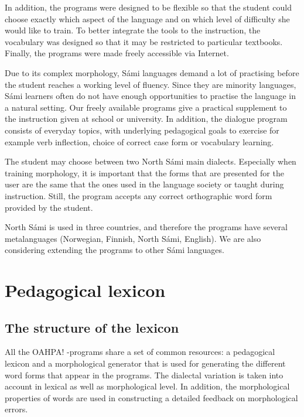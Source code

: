 \documentclass[11pt]{article}
\begin{document}
In addition, the programs were designed to be flexible so that the student could choose exactly which aspect of the language and on which level of difficulty she would like to train. To better integrate the tools to the instruction, the vocabulary was designed so that it may be restricted to particular textbooks. Finally, the programs were made freely accessible via Internet.

Due to its complex morphology, Sámi languages demand a lot of practising before the student reaches 
a working level of fluency. %
Since they are minority languages, Sámi learners often do not have enough opportunities to practise the language in a natural setting. Our freely available programs give a practical supplement to the instruction given at school or university. In addition, the dialogue program consists of everyday topics, with underlying pedagogical goals to exercise for example verb inflection, choice of correct case form or vocabulary learning. 

The student may choose between two North Sámi main dialects. Especially when training morphology, it is important that the forms that are presented for the user are the same that the ones used in the language society or taught during instruction. Still, the program accepts any correct orthographic word form provided by the student.

North Sámi is used in three countries, and therefore the programs have several metalanguages (Norwegian, Finnish, North Sámi, English). We are also considering extending the programs to other Sámi languages.

\section{Pedagogical lexicon}

\subsection{The structure of the lexicon}


All the OAHPA! -programs share a set of common resources: a pedagogical lexicon and a morphological generator that is used for generating the different word forms that appear in the programs. The dialectal variation is taken into account in lexical as well as morphological level. In addition, the morphological properties of words are used in constructing a detailed feedback on morphological errors.
\end{document}
